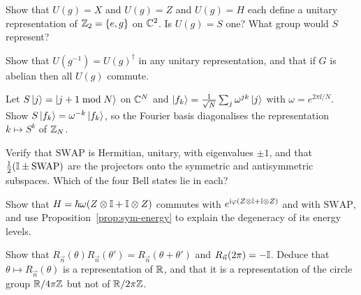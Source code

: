 \begin{exerciseset}
   Show that $U(g)=X$ and $U(g)=Z$ and $U(g)=H$ each define a unitary representation of $\mathbb{Z}_2=\{e,g\}$ on $\mathbb{C}^2$. Is $U(g)=S$ one? What group would $S$ represent?

   Show that $U(g^{-1})=U(g)^\dagger$ in any unitary representation, and that if $G$ is abelian then all $U(g)$ commute.

   Let $S\left|j\right\rangle=\left|j+1\bmod N\right\rangle$ on $\mathbb{C}^N$ and $\left|f_k\right\rangle=\frac1{\sqrt N}\sum_j\omega^{jk}\left|j\right\rangle$ with $\omega=e^{2\pi\ii/N}$. Show $S\left|f_k\right\rangle=\omega^{-k}\left|f_k\right\rangle$, so the Fourier basis diagonalises the representation $k\mapsto S^k$ of $\mathbb{Z}_N$.\label{ex:shift-fourier}

   Verify that $\mathrm{SWAP}$ is Hermitian, unitary, with eigenvalues $\pm1$, and that $\tfrac12(\mathbb{I}\pm\mathrm{SWAP})$ are the projectors onto the symmetric and antisymmetric subspaces. Which of the four Bell states lie in each?

   Show that $H=\hbar\omega(Z\otimes\mathbb{I}+\mathbb{I}\otimes Z)$ commutes with $e^{\mathrm{i}\varphi(Z\otimes\mathbb{I}+\mathbb{I}\otimes Z)}$ and with $\mathrm{SWAP}$, and use Proposition~\ref{prop:sym-energy} to explain the degeneracy of its energy levels.

   Show that $R_{\vec n}(\theta)R_{\vec n}(\theta')=R_{\vec n}(\theta+\theta')$ and $R_{\vec n}(2\pi)=-\mathbb{I}$. Deduce that $\theta\mapsto R_{\vec n}(\theta)$ is a representation of $\mathbb{R}$, and that it is a representation of the circle group $\mathbb{R}/4\pi\mathbb{Z}$ but not of $\mathbb{R}/2\pi\mathbb{Z}$.
\end{exerciseset}
